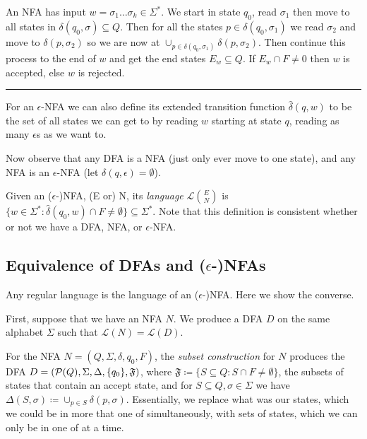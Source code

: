 \documentclass[10pt,a4paper]{article}
\begin{document}
An NFA has input $w = \sigma_1\ldots\sigma_k \in \Sigma^\ast$. We start in state $q_0$, read $\sigma_1$ then move to all states in $\delta(q_0, \sigma) \subseteq Q$. Then for all the states $p \in \delta(q_0, \sigma_1)$ we read $\sigma_2$ and move to $\delta(p, \sigma_2)$ so we are now at $\cup_{p\in\delta(q_0, \sigma_1)} \delta(p, \sigma_2)$. Then continue this process to the end of $w$ and get the end states $E_w \subseteq Q$. If $E_w \cap F \neq 0$ then $w$ is accepted, else $w$ is rejected.
\hrule







For an $\epsilon$-NFA we can also define its extended transition function $\hat{\delta}(q,w)$ to be the set of all states we can get to by reading $w$ starting at state $q$, reading as many $\epsilon$s as we want to.

Now observe that any DFA is a NFA (just only ever move to one state), and any NFA is an $\epsilon$-NFA (let $\delta(q,\epsilon) = \emptyset$).

Given an ($\epsilon$-)NFA, (E or) N, its \emph{language} $\mathcal{L}\binom{E}{N}$ is $\{w \in \Sigma^{\ast} : \hat{\delta}(q_0, w) \cap F \neq \emptyset\} \subseteq \Sigma^{\ast}$. Note that this definition is consistent whether or not we have a DFA, NFA, or $\epsilon$-NFA.

\subsection*{Equivalence of DFAs and ($\epsilon$-)NFAs}
Any regular language is the language of an ($\epsilon$-)NFA. Here we show the converse.

First, suppose that we have an NFA $N$. We produce a DFA $D$ on the same alphabet $\Sigma$ such that $\mathcal{L}(N) = \mathcal{L}(D)$.

For the NFA $N = (Q,\Sigma, \delta, q_0, F)$, the \emph{subset construction} for $N$ produces the DFA $D = (\mathcal{P}(Q), \Sigma, \Delta, \{q_0\}, \mathfrak{F})$, where $\mathfrak{F} \coloneqq \{S\subseteq Q : S\cap F \neq \emptyset \}$, the subsets of states that contain an accept state, and for $S \subseteq Q, \sigma \in \Sigma$ we have $\Delta(S, \sigma) \coloneqq \cup_{p\in S} \delta(p, \sigma)$. Essentially, we replace what was our states, which we could be in more that one of simultaneously, with sets of states, which we can only be in one of at a time.
\end{document}
